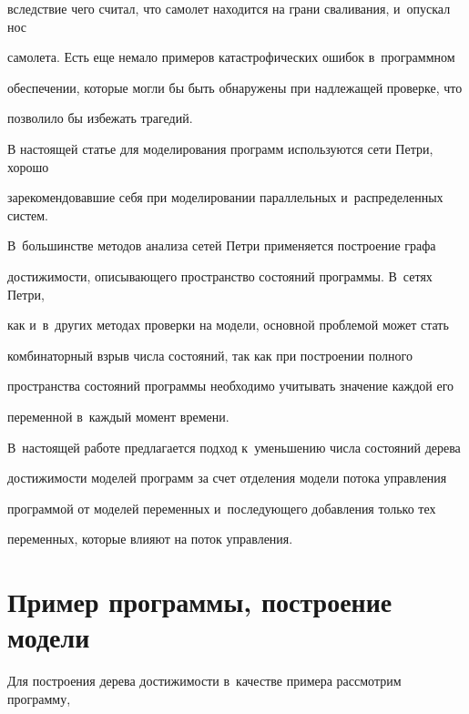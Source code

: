 вследствие чего считал, что самолет находится на грани сваливания, и~опус\-кал нос 


самолета. Есть еще немало примеров катастрофических ошибок в~программном 


обеспечении, которые могли бы быть обнаружены при над\-ле\-жа\-щей проверке, что 


поз\-во\-ли\-ло бы избежать трагедий.





В настоящей статье для моделирования программ используются сети Пет\-ри, хорошо 


зарекомендовавшие себя при моделировании па\-рал\-лель\-ных и~рас\-пре\-де\-лен\-ных сис\-тем. 


В~большинстве методов анализа сетей Пет\-ри применяется по\-стро\-ение графа 


достижимости, опи\-сы\-ва\-юще\-го пространство со\-сто\-яний программы. В~сетях Петри, 


как и~в~других методах проверки на модели, основ\-ной проб\-ле\-мой может стать 


комбинаторный взрыв чис\-ла со\-сто\-яний, так как  при по\-стро\-ении пол\-но\-го 


про\-стран\-ст\-ва со\-сто\-яний программы необходимо учитывать значение каж\-дой его 


переменной в~каж\-дый момент времени.


В~на\-сто\-ящей работе предлагается подход к~уменьшению чис\-ла со\-сто\-яний дерева 


достижимости моделей программ за счет отделения модели потока управ\-ле\-ния 


программой от моделей переменных и~по\-сле\-ду\-юще\-го до\-бав\-ле\-ния только тех 


переменных, которые  влияют на поток управ\-ле\-ния.











\section{Пример программы, построение модели}  








Для построения дерева достижимости в~качестве примера рас\-смот\-рим программу, 


